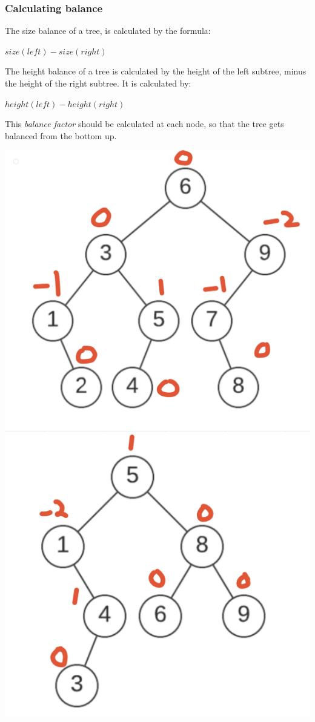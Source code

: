 \documentclass[14]{article}
\begin{document}
\subsubsection{Calculating balance}
The size balance of a tree, is calculated by the formula:
\begin{center}
    $size(left) - size(right)$
\end{center}
The height balance of a tree is calculated by the height of the left subtree, minus the height of the right subtree.
It is calculated by:
\begin{center}
    $height(left) - height(right)$
\end{center}
This \emph{balance factor} should be calculated at each node, so that the tree gets balanced from the bottom up.
\begin{center}
\includegraphics[scale=0.25]{images/balance_1.png}
\includegraphics[scale=0.25]{images/balance_2.png}
\end{center}
\end{document}
